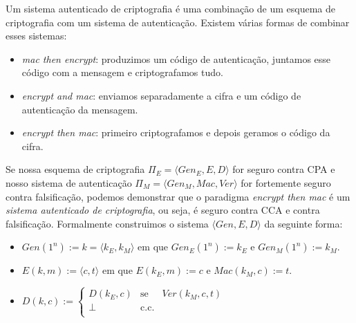 


Um sistema autenticado de criptografia é uma combinação de um esquema de criptografia com um sistema de autenticação.
Existem várias formas de combinar esses sistemas: 
\begin{itemize}
\item {\em mac then encrypt}: produzimos um código de autenticação, juntamos esse código com a mensagem e criptografamos tudo.
\item {\em encrypt and mac}: enviamos separadamente a cifra e um código de autenticação da mensagem.
\item {\em encrypt then mac}: primeiro criptografamos e depois geramos o código da cifra.
\end{itemize}

Se nossa esquema de criptografia $\Pi_E = \langle Gen_E, E, D\rangle$ for seguro contra CPA e nosso sistema de autenticação $\Pi_M = \langle Gen_M, Mac, Ver \rangle$ for fortemente seguro contra falsificação, podemos demonstrar que o paradigma {\em encrypt then mac} é um {\em sistema autenticado de criptografia}, ou seja, é seguro contra CCA e contra falsificação.
Formalmente construimos o sistema $\langle Gen, E, D \rangle$ da seguinte forma:
\begin{itemize}
\item $Gen(1^n) := k = \langle k_E, k_M \rangle$ em que $Gen_E(1^n) := k_E$ e $Gen_M(1^n) := k_M$.
\item $E(k,m) := \langle c, t \rangle$ em que $E(k_E, m) := c$ e $Mac(k_M, c) := t$.
\item $D(k,c) := \left\{
    \begin{array}{lcl}
      D(k_E, c) & \textrm{se} & Ver(k_M, c, t)\\
      \bot & \textrm{c.c.} &\\
    \end{array}
    \right.$
\end{itemize}

